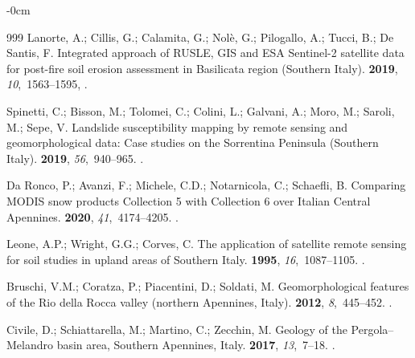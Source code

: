 \documentclass[jimaging,article,accept,pdftex,oneauthor]{Definitions/mdpi}
\begin{document}
\begin{adjustwidth}{-\extralength}{0cm}
\begin{thebibliography}{999}
Lanorte, A.; Cillis, G.; Calamita, G.; Nol{\`e}, G.; Pilogallo, A.; Tucci, B.;
  De Santis, F.
\newblock Integrated approach of RUSLE, GIS and ESA Sentinel-2 satellite data
  for post-fire soil erosion assessment in Basilicata region (Southern Italy).
 {\bf 2019}, {\em
  10},~1563--1595,
.

Spinetti, C.; Bisson, M.; Tolomei, C.; Colini, L.; Galvani, A.; Moro, M.;
  Saroli, M.; Sepe, V.
\newblock Landslide susceptibility mapping by remote sensing and
  geomorphological data: Case studies on the Sorrentina Peninsula (Southern
  Italy).
 {\bf 2019}, {\em 56},~940--965.
.

{Da Ronco}, P.; Avanzi, F.; Michele, C.D.; Notarnicola, C.; Schaefli, B.
\newblock Comparing MODIS snow products Collection 5 with Collection 6 over
  Italian Central Apennines.
 {\bf 2020}, {\em
  41},~4174--4205.
.

Leone, A.P.; Wright, G.G.; Corves, C.
\newblock The application of satellite remote sensing for soil studies in
  upland areas of Southern Italy.
 {\bf 1995}, {\em
  16},~1087--1105.
.

Bruschi, V.M.; Coratza, P.; Piacentini, D.; Soldati, M.
\newblock Geomorphological features of the Rio della Rocca valley (northern
  Apennines, Italy).
 {\bf 2012}, {\em 8},~445--452.
.

Civile, D.; Schiattarella, M.; Martino, C.; Zecchin, M.
\newblock Geology of the Pergola--Melandro basin area, Southern Apennines,
  Italy.
 {\bf 2017}, {\em 13},~7--18.
.


\end{thebibliography}
\end{adjustwidth}
\end{document}
